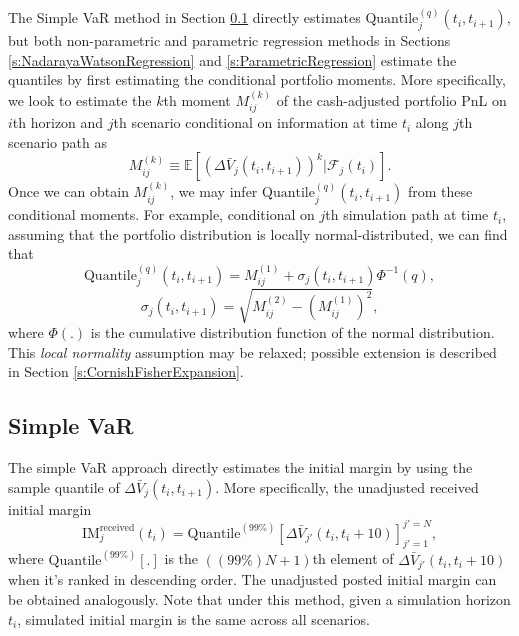 \documentclass[preprint,12pt]{elsarticle}
\begin{document}
The Simple VaR method in Section \ref{s:SimpleVaR} directly estimates $\textrm{Quantile}_{j}^{(q)}(t_{i},t_{i+1})$, but both non-parametric and parametric regression methods in Sections \ref{s:NadarayaWatsonRegression} and \ref{s:ParametricRegression} estimate the quantiles by first estimating the conditional portfolio moments. More specifically, we look to estimate the $k$th moment $M_{ij}^{(k)}$ of the cash-adjusted portfolio PnL on $i$th horizon and $j$th scenario conditional on information at time $t_i$ along $j$th scenario path as
\begin{equation}\label{eq:momentDefinition}
M_{ij}^{(k)}\equiv\mathbb{E}\left[\left(\Delta\bar{V}_{j}(t_{i},t_{i+1})\right)^{k}|\mathcal{F}_{j}(t_{i})\right].
\end{equation}
Once we can obtain $M_{ij}^{(k)}$, we may infer $\textrm{Quantile}_{j}^{(q)}(t_{i},t_{i+1})$ from these conditional moments. For example, conditional on $j$th simulation path at time $t_i$, assuming that the portfolio distribution is locally normal-distributed, we can find that
\begin{equation}\label{eq:localNormalityQuantile}
\textrm{Quantile}_{j}^{(q)}(t_{i},t_{i+1})=M_{ij}^{(1)}+\sigma_{j}(t_{i},t_{i+1})\Phi^{-1}\left(q\right),
\end{equation}
 \begin{equation}
\sigma_{j}(t_{i},t_{i+1})=\sqrt{M_{ij}^{(2)}-\left(M_{ij}^{(1)}\right)^{2}},
\end{equation}
where $\Phi\left(.\right)$ is the cumulative distribution function of the normal distribution. This \emph{local normality} assumption may be relaxed; possible extension is described in Section \ref{s:CornishFisherExpansion}.

\subsection{Simple VaR}\label{s:SimpleVaR}
The simple VaR approach directly estimates the initial margin by using the sample quantile of $\Delta\bar{V}_{j}(t_{i},t_{i+1})$. More specifically, the unadjusted received initial margin
\begin{equation}
\textrm{IM}_{j}^{\textrm{received}}(t_{i})=\textrm{Quantile}^{(99\%)}\left[\Delta\bar{V}_{j'}(t_{i},t_{i}+10)\right]_{j'=1}^{j'=N},
\end{equation}
 where $\textrm{Quantile}^{(99\%)}\left[.\right]$ is the $\left((99\%)N+1\right)$th element of $\Delta\bar{V}_{j'}(t_{i},t_{i}+10)$ when it's ranked in descending order. The unadjusted posted initial margin can be obtained analogously. Note that under this method, given a simulation horizon $t_i$, simulated initial margin is the same across all scenarios.
\end{document}
